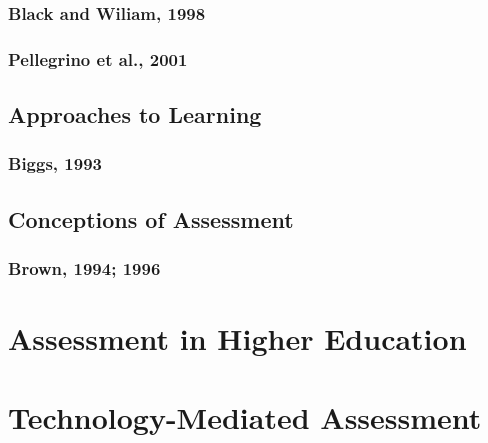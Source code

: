 \documentclass[
]{book}
\begin{document}
\hypertarget{black-and-wiliam-1998}{%
\subsubsection*{Black and Wiliam, 1998}\label{black-and-wiliam-1998}}

\hypertarget{pellegrino-et-al.-2001}{%
\subsubsection*{Pellegrino et al., 2001}\label{pellegrino-et-al.-2001}}

\hypertarget{approaches-to-learning}{%
\subsection*{Approaches to Learning}\label{approaches-to-learning}}

\hypertarget{biggs-1993}{%
\subsubsection*{Biggs, 1993}\label{biggs-1993}}

\hypertarget{conceptions-of-assessment}{%
\subsection*{Conceptions of Assessment}\label{conceptions-of-assessment}}

\hypertarget{brown-1994-1996}{%
\subsubsection*{Brown, 1994; 1996}\label{brown-1994-1996}}

\hypertarget{assessment-in-higher-education}{%
\section*{Assessment in Higher Education}\label{assessment-in-higher-education}}

\hypertarget{technology-mediated-assessment}{%
\section*{Technology-Mediated Assessment}\label{technology-mediated-assessment}}
\end{document}
